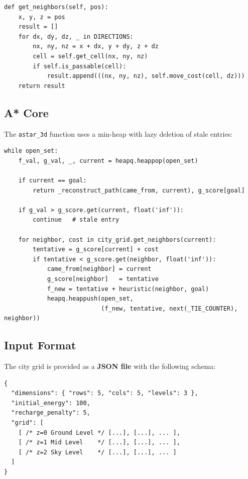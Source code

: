 \documentclass[12pt]{article}
\begin{document}
\begin{lstlisting}[caption={CityGrid.get\_neighbors — cost-aware 3D neighbourhood.}]
def get_neighbors(self, pos):
    x, y, z = pos
    result = []
    for dx, dy, dz, _ in DIRECTIONS:
        nx, ny, nz = x + dx, y + dy, z + dz
        cell = self.get_cell(nx, ny, nz)
        if self.is_passable(cell):
            result.append(((nx, ny, nz), self.move_cost(cell, dz)))
    return result
\end{lstlisting}

\subsection{A* Core}

The \texttt{astar\_3d} function uses a min-heap with lazy deletion of stale entries:

\begin{lstlisting}[caption={Core A* loop.}]
while open_set:
    f_val, g_val, _, current = heapq.heappop(open_set)

    if current == goal:
        return _reconstruct_path(came_from, current), g_score[goal]

    if g_val > g_score.get(current, float('inf')):
        continue   # stale entry

    for neighbor, cost in city_grid.get_neighbors(current):
        tentative = g_score[current] + cost
        if tentative < g_score.get(neighbor, float('inf')):
            came_from[neighbor] = current
            g_score[neighbor]   = tentative
            f_new = tentative + heuristic(neighbor, goal)
            heapq.heappush(open_set,
                           (f_new, tentative, next(_TIE_COUNTER), neighbor))
\end{lstlisting}

\subsection{Input Format}

The city grid is provided as a \textbf{JSON file} with the following schema:

\begin{lstlisting}[language={},caption={city\_grid.json structure.}]
{
  "dimensions": { "rows": 5, "cols": 5, "levels": 3 },
  "initial_energy": 100,
  "recharge_penalty": 5,
  "grid": [
    [ /* z=0 Ground Level */ [...], [...], ... ],
    [ /* z=1 Mid Level    */ [...], [...], ... ],
    [ /* z=2 Sky Level    */ [...], [...], ... ]
  ]
}
\end{lstlisting}
\end{document}
